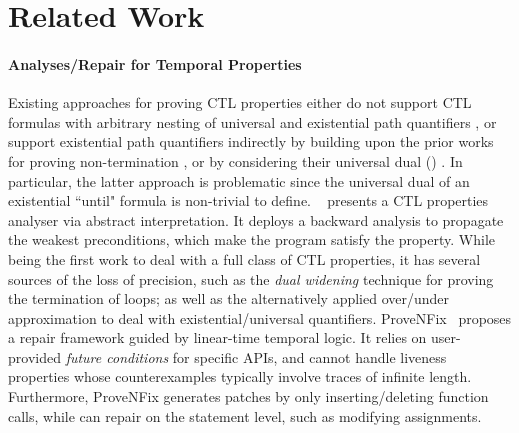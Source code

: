 \section{Related Work}
\label{related_work}



\paragraph*{\textbf{Analyses/Repair for Temporal Properties}} 

Existing approaches for proving CTL properties either do not 
support CTL formulas with arbitrary nesting of universal and existential path quantifiers 
\cite{DBLP:conf/cav/CookKV11}, 
or support existential path quantifiers indirectly by building upon the prior works 
for proving non-termination \cite{DBLP:conf/popl/GuptaHMRX08}, or by considering their universal dual (\terminator) \cite{DBLP:conf/fmcad/CookKP14}. In particular, the latter approach is problematic since the universal dual of an existential ``until" formula is non-trivial to define. 
\function~\cite{DBLP:conf/sas/UrbanU018} presents a CTL properties analyser via abstract interpretation. It deploys a backward analysis to propagate the weakest preconditions, which make the program satisfy the property. While being the first work to deal with a full class of CTL properties, it has several sources of the loss of precision, such as the \emph{dual widening} \cite{DBLP:conf/tacas/CourantU17} technique for proving the termination of loops; as well as the alternatively applied over/under approximation to deal with existential/universal quantifiers. 
ProveNFix~\cite{song2024provenfix} proposes a repair framework guided by linear-time temporal logic. It relies on user-provided \emph{future conditions} for specific APIs, and cannot handle liveness properties whose counterexamples typically involve traces of infinite length. 
Furthermore, ProveNFix generates patches by only inserting/deleting function calls, while \toolName can repair on the statement level, such as modifying assignments. 




